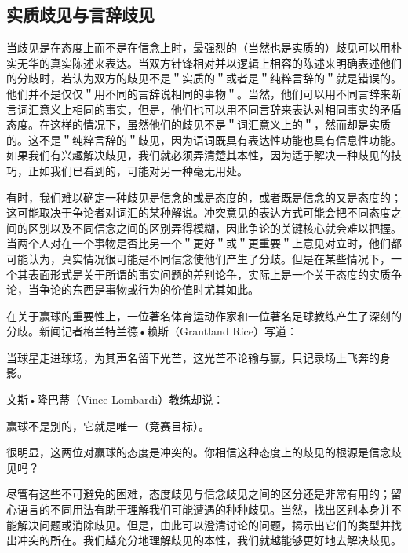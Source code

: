 \subsection{实质歧见与言辞歧见}

当歧见是在态度上而不是在信念上时，最强烈的（当然也是实质的）歧见可以用朴实无华的真实陈述来表达。当双方针锋相对并以逻辑上相容的陈述来明确表述他们的分歧时，若认为双方的歧见不是＂实质的＂或者是＂纯粹言辞的＂就是错误的。他们并不是仅仅＂用不同的言辞说相同的事物＂。当然，他们可以用不同言辞来断言词汇意义上相同的事实，但是，他们也可以用不同言辞来表达对相同事实的矛盾态度。在这样的情况下，虽然他们的歧见不是＂词汇意义上的＂，然而却是实质的。这不是＂纯粹言辞的＂歧见，因为语词既具有表达性功能也具有信息性功能。如果我们有兴趣解决歧见，我们就必须弄清楚其本性，因为适于解决一种歧见的技巧，正如我们已看到的，可能对另一种毫无用处。

有时，我们难以确定一种歧见是信念的或是态度的，或者既是信念的又是态度的；这可能取决于争论者对词汇的某种解说。冲突意见的表达方式可能会把不同态度之间的区别以及不同信念之间的区别弄得模糊，因此争论的关键核心就会难以把握。当两个人对在一个事物是否比另一个＂更好＂或＂更重要＂上意见对立时，他们都可能认为，真实情况很可能是不同信念使他们产生了分歧。但是在某些情况下，一个其表面形式是关于所谓的事实问题的差别论争，实际上是一个关于态度的实质争论，当争论的东西是事物或行为的价值时尤其如此。

在关于赢球的重要性上，一位著名体育运动作家和一位著名足球教练产生了深刻的分歧。新闻记者格兰特兰德•赖斯（Grantland Rice）写道：

\begin{displayquote}
当球星走进球场，为其声名留下光芒，这光芒不论输与赢，只记录场上飞奔的身影。
\end{displayquote}

文斯•隆巴蒂（Vince Lombardi）教练却说：

\begin{displayquote}
赢球不是别的，它就是唯一（竞赛目标）。
\end{displayquote}

很明显，这两位对赢球的态度是冲突的。你相信这种态度上的歧见的根源是信念歧见吗？

尽管有这些不可避免的困难，态度歧见与信念歧见之间的区分还是非常有用的；留心语言的不同用法有助于理解我们可能遭遇的种种歧见。当然，找出区别本身并不能解决问题或消除歧见。但是，由此可以澄清讨论的问题，揭示出它们的类型并找出冲突的所在。我们越充分地理解歧见的本性，我们就越能够更好地去解决歧见。

